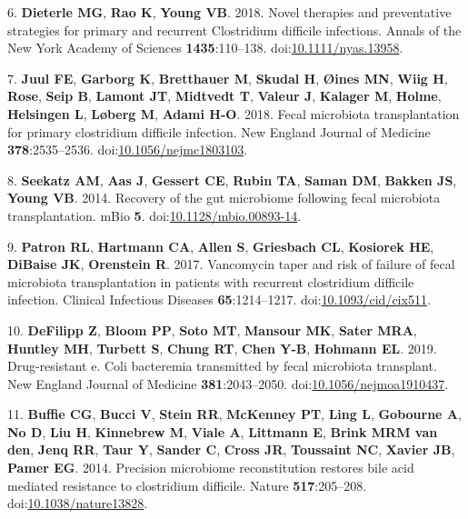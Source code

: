 \documentclass[11pt,]{article}
\newlength{\cslhangindent}
\newenvironment{cslreferences}%
  {\setlength{\parindent}{0pt}%
  \everypar{\setlength{\hangindent}{\cslhangindent}}\ignorespaces}%
  {\par}
\begin{document}
\begin{cslreferences}
\leavevmode\hypertarget{ref-dieterle2019}{}%
6. \textbf{Dieterle MG}, \textbf{Rao K}, \textbf{Young VB}. 2018. Novel
therapies and preventative strategies for primary and recurrent
Clostridium difficile infections. Annals of the New York Academy of
Sciences \textbf{1435}:110--138.
doi:\href{https://doi.org/10.1111/nyas.13958}{10.1111/nyas.13958}.

\leavevmode\hypertarget{ref-juul2018}{}%
7. \textbf{Juul FE}, \textbf{Garborg K}, \textbf{Bretthauer M},
\textbf{Skudal H}, \textbf{Øines MN}, \textbf{Wiig H}, \textbf{Rose},
\textbf{Seip B}, \textbf{Lamont JT}, \textbf{Midtvedt T}, \textbf{Valeur
J}, \textbf{Kalager M}, \textbf{Holme}, \textbf{Helsingen L},
\textbf{Løberg M}, \textbf{Adami H-O}. 2018. Fecal microbiota
transplantation for primary clostridium difficile infection. New England
Journal of Medicine \textbf{378}:2535--2536.
doi:\href{https://doi.org/10.1056/nejmc1803103}{10.1056/nejmc1803103}.

\leavevmode\hypertarget{ref-seekatz2014}{}%
8. \textbf{Seekatz AM}, \textbf{Aas J}, \textbf{Gessert CE},
\textbf{Rubin TA}, \textbf{Saman DM}, \textbf{Bakken JS}, \textbf{Young
VB}. 2014. Recovery of the gut microbiome following fecal microbiota
transplantation. mBio \textbf{5}.
doi:\href{https://doi.org/10.1128/mbio.00893-14}{10.1128/mbio.00893-14}.

\leavevmode\hypertarget{ref-patron2017}{}%
9. \textbf{Patron RL}, \textbf{Hartmann CA}, \textbf{Allen S},
\textbf{Griesbach CL}, \textbf{Kosiorek HE}, \textbf{DiBaise JK},
\textbf{Orenstein R}. 2017. Vancomycin taper and risk of failure of
fecal microbiota transplantation in patients with recurrent clostridium
difficile infection. Clinical Infectious Diseases
\textbf{65}:1214--1217.
doi:\href{https://doi.org/10.1093/cid/cix511}{10.1093/cid/cix511}.

\leavevmode\hypertarget{ref-defilipp2019}{}%
10. \textbf{DeFilipp Z}, \textbf{Bloom PP}, \textbf{Soto MT},
\textbf{Mansour MK}, \textbf{Sater MRA}, \textbf{Huntley MH},
\textbf{Turbett S}, \textbf{Chung RT}, \textbf{Chen Y-B},
\textbf{Hohmann EL}. 2019. Drug-resistant e. Coli bacteremia transmitted
by fecal microbiota transplant. New England Journal of Medicine
\textbf{381}:2043--2050.
doi:\href{https://doi.org/10.1056/nejmoa1910437}{10.1056/nejmoa1910437}.

\leavevmode\hypertarget{ref-buffie2015}{}%
11. \textbf{Buffie CG}, \textbf{Bucci V}, \textbf{Stein RR},
\textbf{McKenney PT}, \textbf{Ling L}, \textbf{Gobourne A}, \textbf{No
D}, \textbf{Liu H}, \textbf{Kinnebrew M}, \textbf{Viale A},
\textbf{Littmann E}, \textbf{Brink MRM van den}, \textbf{Jenq RR},
\textbf{Taur Y}, \textbf{Sander C}, \textbf{Cross JR}, \textbf{Toussaint
NC}, \textbf{Xavier JB}, \textbf{Pamer EG}. 2014. Precision microbiome
reconstitution restores bile acid mediated resistance to clostridium
difficile. Nature \textbf{517}:205--208.
doi:\href{https://doi.org/10.1038/nature13828}{10.1038/nature13828}.


\end{cslreferences}
\end{document}
